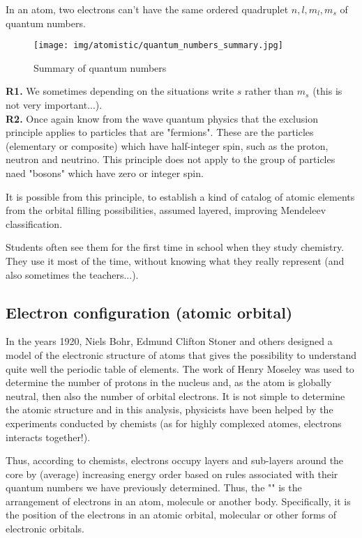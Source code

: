 	In an atom, two electrons can't have the same ordered quadruplet $n,l,m_l,m_s$ of quantum numbers.
	\begin{figure}[H]
		\centering
		\texttt{[image: img/atomistic/quantum\_numbers\_summary.jpg]}
		\caption{Summary of quantum numbers}
	\end{figure}
	\begin{tcolorbox}[title=Remarks,colframe=black,arc=10pt]
	\textbf{R1.} We sometimes depending on the situations write $s$ rather than $m_s$ (this is not very important...).\\
	
	\textbf{R2.} Once again know from the wave quantum physics that the exclusion principle applies to particles that are "fermions". These are the particles (elementary or composite) which have half-integer spin, such as the proton, neutron and neutrino. This principle does not apply to the group of particles naed "bosons" which have zero or integer spin.
	\end{tcolorbox}
	It is possible from this principle, to establish a kind of catalog of atomic elements from the orbital filling possibilities, assumed layered, improving Mendeleev classification.

	Students often see them for the first time in school when they study chemistry. They use it most of the time, without knowing what they really represent (and also sometimes the teachers...).
	
	\subsection{Electron configuration (atomic orbital)}\label{electron configuration}
	In the years 1920, Niels Bohr, Edmund Clifton Stoner and others designed a model of the electronic structure of atoms that gives the possibility to understand quite well the periodic table of elements. The work of Henry Moseley was used to determine the number of protons in the nucleus and, as the atom is globally neutral, then also the number of orbital electrons. It is not simple to determine the atomic structure and in this analysis, physicists have been helped by the experiments conducted by chemists (as for highly complexed atomes, electrons interacts together!).

	Thus, according to chemists, electrons occupy layers and sub-layers around the core by (average) increasing energy order based on rules associated with their quantum numbers we have previously determined. Thus, the "" is the arrangement of electrons in an atom, molecule or another body. Specifically, it is the position of the electrons in an atomic orbital, molecular or other forms of electronic orbitals.
	
